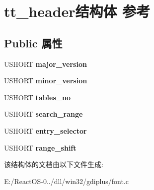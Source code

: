 \hypertarget{structtt__header}{}\section{tt\+\_\+header结构体 参考}
\label{structtt__header}
\subsection*{Public 属性}
\begin{DoxyCompactItemize}
\item 
\mbox{\label{structtt__header_a43a33d34524124bb8a69a094e8c1613b}} 
U\+S\+H\+O\+RT {\bfseries major\+\_\+version}
\item 
\mbox{\label{structtt__header_a863b21e632770285abf84f7f232d0a49}} 
U\+S\+H\+O\+RT {\bfseries minor\+\_\+version}
\item 
\mbox{\label{structtt__header_a0ad875b63d349b3b4cb6d6c88e6a8c38}} 
U\+S\+H\+O\+RT {\bfseries tables\+\_\+no}
\item 
\mbox{\label{structtt__header_a820b38beaeb7bdf63dd53f84d424a408}} 
U\+S\+H\+O\+RT {\bfseries search\+\_\+range}
\item 
\mbox{\label{structtt__header_a0226793dbef3d5bbbfcf1bfc475048e2}} 
U\+S\+H\+O\+RT {\bfseries entry\+\_\+selector}
\item 
\mbox{\label{structtt__header_adcd4c8e54e5cb75ba7d232e7a984495f}} 
U\+S\+H\+O\+RT {\bfseries range\+\_\+shift}
\end{DoxyCompactItemize}


该结构体的文档由以下文件生成\+:\begin{DoxyCompactItemize}
\item 
E\+:/\+React\+O\+S-\/0../dll/win32/gdiplus/font.\+c\end{DoxyCompactItemize}

